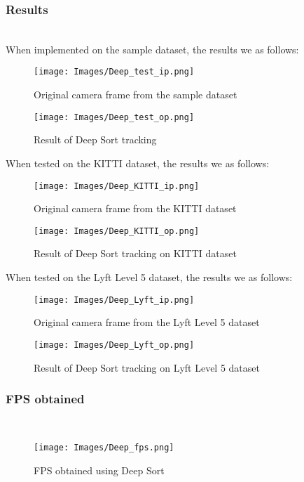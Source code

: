 \documentclass[conference]{IEEEtran}
\begin{document}
\subsubsection*{\textbf{Results}}
\\
When implemented on the sample dataset, the results we as follows:
\begin{figure}[H]
  \centering
  \texttt{[image: Images/Deep\_test\_ip.png]}
  \caption{Original camera frame from the sample dataset}
\end{figure}

\begin{figure}[H]
  \centering
  \texttt{[image: Images/Deep\_test\_op.png]}
  \caption{Result of Deep Sort tracking}
\end{figure}

When tested on the KITTI dataset, the results we as follows:
\begin{figure}[H]
  \centering
  \texttt{[image: Images/Deep\_KITTI\_ip.png]}
  \caption{Original camera frame from the KITTI dataset}
\end{figure}

\begin{figure}[H]
  \centering
  \texttt{[image: Images/Deep\_KITTI\_op.png]}
  \caption{Result of Deep Sort tracking on KITTI dataset}
\end{figure}

When tested on the Lyft Level 5 dataset, the results we as follows:
\begin{figure}[H]
  \centering
  \texttt{[image: Images/Deep\_Lyft\_ip.png]}
  \caption{Original camera frame from the Lyft Level 5 dataset}
\end{figure}

\begin{figure}[H]
  \centering
  \texttt{[image: Images/Deep\_Lyft\_op.png]}
  \caption{Result of Deep Sort tracking on Lyft Level 5 dataset}
\end{figure}

\subsubsection*{\textbf{FPS obtained}} \\
\begin{figure}[H]
  \centering
  \texttt{[image: Images/Deep\_fps.png]}
  \caption{FPS obtained using Deep Sort}
\end{figure}
\end{document}
